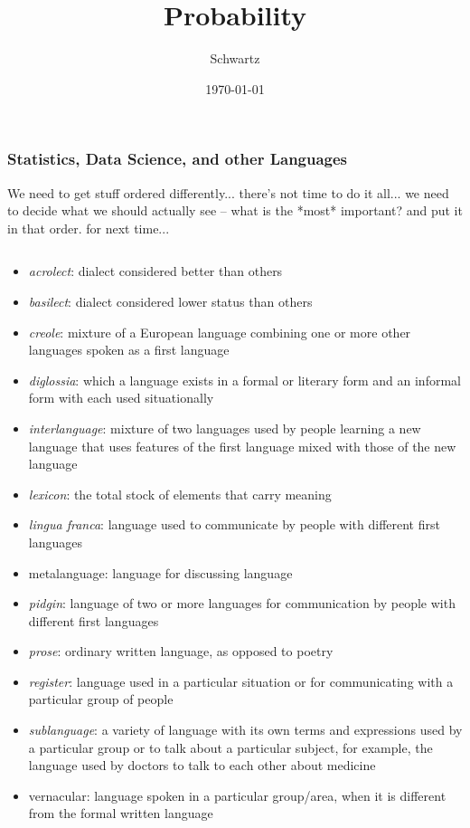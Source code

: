 \documentclass[xcolor={dvipsnames}]{beamer}
\title{Probability}
\author{Schwartz}
\date{\today}
\begin{document}
\frame{\titlepage}


\frame
{
 \frametitle{Statistics, Data Science, and other Languages}

We need to get stuff ordered differently... there's not time to do it all...
we need to decide what we should actually see -- what is the *most* important?
and put it in that order.  for next time...

\tiny
\begin{columns}
\begin{column}{0.55\textwidth}
\begin{itemize}
\item \emph{acrolect}: dialect considered better than others
\item \emph{basilect}: dialect considered lower status than others
\item \emph{creole}: mixture of a European language combining  one or more other languages spoken as a first language
\item \emph{diglossia}: which a language exists in a formal or literary form and an informal form with each used situationally
\item \emph{interlanguage}: mixture of two languages used by people learning a new language that uses features of the first language mixed with those of the new language
\item \emph{lexicon}:
the total stock of elements that carry meaning
\item \emph{lingua franca}:
language used to communicate by people with different first languages
\item metalanguage: language for discussing language
\item \emph{pidgin}: language of two or more languages for communication by people with different first languages
\item \emph{prose}: ordinary written language, as opposed to poetry
\item \emph{register}:  language used in a particular situation or for communicating with a particular group of people
\item \emph{sublanguage}: 
a variety of language with its own terms and expressions used by a particular group or to talk about a particular subject, for example, the language used by doctors to talk to each other about medicine
\item vernacular: language spoken in a particular group/area, when it is different from the formal written language

\end{itemize}
\end{column}
\end{columns}}
\end{document}
